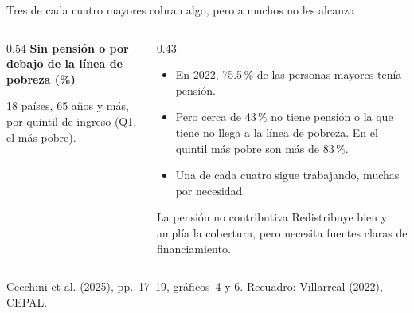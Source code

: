 \documentclass[aspectratio=169,11pt]{beamer}
\newcommand{\fuente}[1]{\par\vfill{\small\color{cGris}#1\par}}
\begin{document}
\begin{frame}{Tres de cada cuatro mayores cobran algo, pero a muchos no les alcanza}
  \begin{columns}[T]
    \begin{column}{0.54\textwidth}
      \centering
      \textbf{Sin pensión o por debajo de la línea de pobreza (\%)}\par\smallskip
      \par{\small\color{cGris}18 países, 65 años y más, por quintil de ingreso (Q1, el más pobre).}
    \end{column}
    \begin{column}{0.43\textwidth}
      \begin{itemize}
        \item En 2022, 75.5\,\% de las personas mayores tenía pensión.
        \item Pero cerca de 43\,\% no tiene pensión o la que tiene no llega a la línea de pobreza. En el quintil más pobre son más de 83\,\%.
        \item Una de cada cuatro sigue trabajando, muchas por necesidad.
      \end{itemize}
      \pause
      \begin{block}{La pensión no contributiva}
        Redistribuye bien y amplía la cobertura, pero necesita fuentes claras de financiamiento.
      \end{block}
    \end{column}
  \end{columns}
  \fuente{Cecchini et al. (2025), pp.~17--19, gráficos~4 y 6. Recuadro: Villarreal (2022), CEPAL.}
\end{frame}
\end{document}
